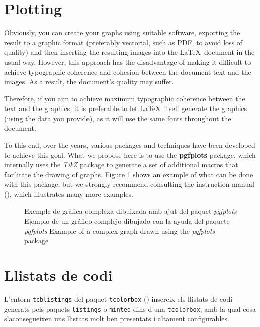   \section{Plotting}
  
  Obviously, you can create your graphs using suitable software, exporting the result to a graphic format (preferably vectorial, such as PDF, to avoid loss of quality) and then inserting the resulting images into the \LaTeX\ document in the usual way. However, this approach has the disadvantage of making it difficult to achieve typographic coherence and cohesion between the document text and the images. As a result, the document's quality may suffer.
  
  Therefore, if you aim to achieve maximum typographic coherence between the text and the graphics, it is preferable to let \LaTeX\ itself generate the graphics (using the data you provide), as it will use the same fonts throughout the document.
  
  To this end, over the years, various packages and techniques have been developed to achieve this goal. What we propose here is to use the \textbf{pgfplots} package, which internally uses the \textit{TikZ} package to generate a set of additional macros that facilitate the drawing of graphs. Figure \ref{fig:plot} shows an example of what can be done with this package, but we strongly recommend consulting the instruction manual (\cite{pgfplots}), which illustrates many more examples.
\fi

\begin{figure}[ht]
  \centering
  
  \caption{\ifcase\doclanguage\or
     Exemple de gràfica complexa dibuixada amb ajut del paquet \emph{pgfplots}\or
     Ejemplo de un gráfico complejo dibujado con la ayuda del paquete \emph{pgfplots}\else
     Example of a complex graph drawn using the \emph{pgfplots} package\fi
  }\label{fig:plot}
\end{figure}

\ifcase\doclanguage\or
  \section{Llistats de codi}
  
  L'entorn \texttt{tcblistings} del paquet \texttt{tcolorbox} (\cite{tcolorbox}) insereix els llistats de codi generats pels paquets \texttt{listings} o \texttt{minted} dins d'una \texttt{tcolorbox}, amb la qual cosa s'aconsegueixen uns llistats molt ben presentats i altament configurables.
  
